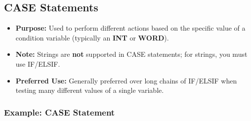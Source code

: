 \documentclass[11pt,a4paper]{article}
\begin{document}
\subsection{CASE Statements}

\begin{itemize}[leftmargin=*]
    \item \textbf{Purpose:} Used to perform different actions based on the specific value of a condition variable (typically an \textbf{INT} or \textbf{WORD}).
    
    \item \textbf{Note:} Strings are \textbf{not} supported in CASE statements; for strings, you must use IF/ELSIF.
    
    \item \textbf{Preferred Use:} Generally preferred over long chains of IF/ELSIF when testing many different values of a single variable.
\end{itemize}

\subsubsection*{Example: CASE Statement}
\end{document}
